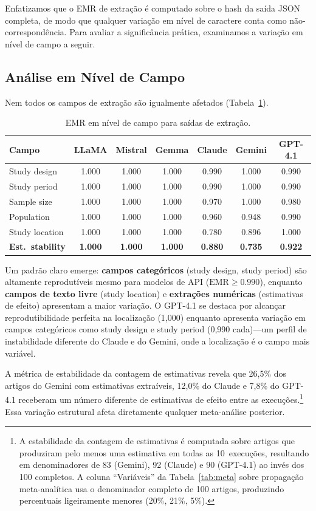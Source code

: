 \documentclass[12pt, a4paper]{article}
\newcommand{\emr}{\textrm{EMR}}
\begin{document}
Enfatizamos que o EMR de extração é computado sobre o hash da saída JSON completa, de modo que qualquer variação em nível de caractere conta como não-correspondência.
Para avaliar a significância prática, examinamos a variação em nível de campo a seguir.

\subsection{Análise em Nível de Campo}
\label{sec:fieldlevel}

Nem todos os campos de extração são igualmente afetados (Tabela~\ref{tab:fields}).

\begin{table}[H]
\centering
\caption{EMR em nível de campo para saídas de extração.}
\label{tab:fields}
\begin{tabular}{lcccccc}
\toprule
\textbf{Campo} & \textbf{LLaMA} & \textbf{Mistral} & \textbf{Gemma} & \textbf{Claude} & \textbf{Gemini} & \textbf{GPT-4.1} \\
\midrule
Study design    & 1.000 & 1.000 & 1.000 & 0.990 & 1.000 & 0.990 \\
Study period    & 1.000 & 1.000 & 1.000 & 0.990 & 1.000 & 0.990 \\
Sample size     & 1.000 & 1.000 & 1.000 & 0.970 & 1.000 & 0.980 \\
Population      & 1.000 & 1.000 & 1.000 & 0.960 & 0.948 & 0.990 \\
Study location  & 1.000 & 1.000 & 1.000 & 0.780 & 0.896 & 1.000 \\
\midrule
\textbf{Est.\ stability} & \textbf{1.000} & \textbf{1.000} & \textbf{1.000} & \textbf{0.880} & \textbf{0.735} & \textbf{0.922} \\
\bottomrule
\end{tabular}
\end{table}

\noindent Um padrão claro emerge: \textbf{campos categóricos} (study design, study period) são altamente reprodutíveis mesmo para modelos de API ($\emr{\geq}0.990$), enquanto \textbf{campos de texto livre} (study location) e \textbf{extrações numéricas} (estimativas de efeito) apresentam a maior variação.
O GPT-4.1 se destaca por alcançar reprodutibilidade perfeita na localização (1,000) enquanto apresenta variação em campos categóricos como study design e study period (0,990 cada)---um perfil de instabilidade diferente do Claude e do Gemini, onde a localização é o campo mais variável.

A métrica de estabilidade da contagem de estimativas revela que 26,5\% dos artigos do Gemini com estimativas extraíveis, 12,0\% do Claude e 7,8\% do GPT-4.1 receberam um número diferente de estimativas de efeito entre as execuções.\footnote{A estabilidade da contagem de estimativas é computada sobre artigos que produziram pelo menos uma estimativa em todas as 10~execuções, resultando em denominadores de 83 (Gemini), 92 (Claude) e 90 (GPT-4.1) ao invés dos 100 completos. A coluna ``Variáveis'' da Tabela~\ref{tab:meta} sobre propagação meta-analítica usa o denominador completo de 100 artigos, produzindo percentuais ligeiramente menores (20\%, 21\%, 5\%).}
Essa variação estrutural afeta diretamente qualquer meta-análise posterior.
\end{document}
